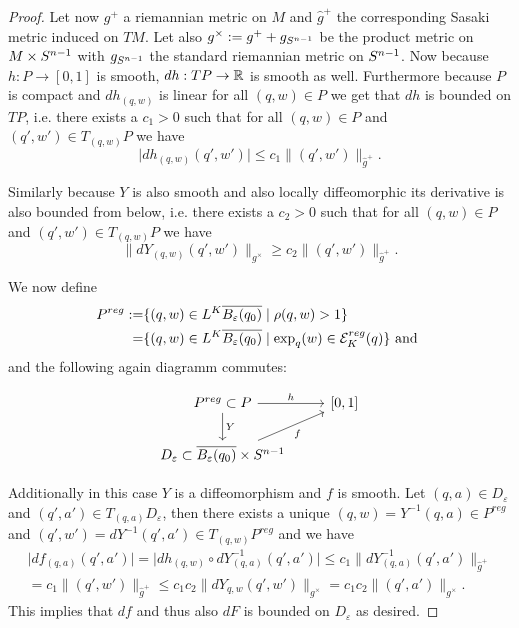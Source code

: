 \begin{proof}
    Let now $g^+$ a riemannian metric on $M$ and $\widehat{g}^+$ the corresponding Sasaki metric induced on $TM$. Let also $g^\times:=g^+ + g_{S^{n-1}}$ be the product metric on $M\times {S^{n-1}}$ with $g_{S^{n-1}}$ the standard riemannian metric on ${S^{n-1}}$.
    Now because $h:P\to [0,1]$ is smooth, $dh:TP\to \mathbb{R}$ is smooth as well. Furthermore because $P$ is compact and $dh_{(q,w)}$ is linear for all $(q,w)\in P$ we get that $dh$ is bounded on $TP$, i.e. 
    there exists a $c_1>0$ such that for all $(q,w)\in P$ and $(q',w')\in T_{(q,w)}P$ we have
    \[
        \lvert dh_{(q,w)}(q',w') \rvert \leq c_1\lVert (q',w') \rVert_{\widehat{g}^+}.
    \]

    Similarly because $Y$ is also smooth and also locally diffeomorphic its derivative is also bounded from below, i.e. there exists a $c_2>0$ such that for all $(q,w)\in P$ and $(q',w')\in T_{(q,w)}P$ we have
    \[
        \lVert dY_{(q,w)}(q',w') \rVert_{g^\times} \geq c_2\lVert (q',w') \rVert_{\widehat{g}^+}.
    \]

    We now define 
    \begin{align*}
        P^{reg}:=& \{(q,w)\in L^K{\overline{B_\varepsilon(q_0)}} \mid \rho(q,w) > 1\}\\
        =& \{(q,w)\in L^K{\overline{B_\varepsilon(q_0)}} \mid \exp_q(w)\in {{\mathcal{E}}^{reg}_K}(q)\} \text{ and }
    \end{align*} and the following again diagramm commutes:

    \[\begin{tikzcd}
        {P^{reg}\subset P} & {[0,1]} \\
        {D_\varepsilon\subset \cl{B_\varepsilon(q_0)}\times \sn}
        \arrow["Y", from=1-1, to=2-1]
        \arrow["h", from=1-1, to=1-2]
        \arrow["f"', from=2-1, to=1-2]
    \end{tikzcd}\]   

    Additionally in this case $Y$ is a diffeomorphism and $f$ is smooth. Let $(q,a)\in D_\varepsilon$ and $(q',a')\in T_{(q,a)}D_\varepsilon$, then there exists a unique $(q,w)=Y^{-1}(q,a)\in P^{reg}$ and $(q',w')=dY^{-1}(q',a')\in T_{(q,w)}P^{reg}$ and we have 
    \begin{align*}
        \lvert df_{(q,a)}(q',a') \rvert = \lvert dh_{(q,w)}\circ dY^{-1}_{(q,a)}(q',a')\rvert\leq c_1 \lVert dY^{-1}_{(q,a)}(q',a')\rVert_{\widehat{g}^+} \\
        = c_1\lVert (q',w') \rVert_{\widehat{g}^+} \leq c_1c_2\lVert dY_{q,w}(q',w') \rVert_{g^\times} = c_1c_2\lVert(q',a')\rVert_{g^\times}.
    \end{align*}
    This implies that $df$ and thus also $dF$ is bounded on $D_\varepsilon$ as desired.
\end{proof}